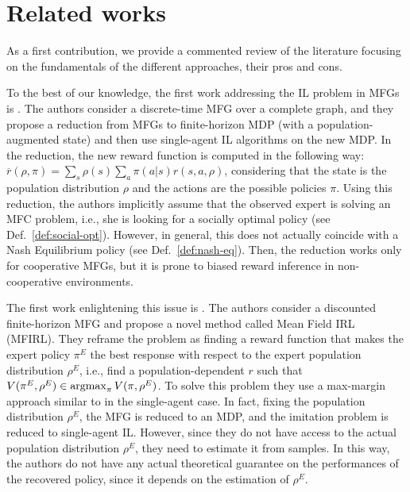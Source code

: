 \documentclass{article}
\begin{document}
\section{Related works}
\label{sec:related}
As a first contribution, we provide a commented review of the literature focusing on the fundamentals of the different approaches, their pros and cons.

% 
To the best of our knowledge, the first work addressing the IL problem in MFGs is \cite{yang2017learning}. The authors consider a discrete-time MFG over a complete graph, and they propose a reduction from MFGs to finite-horizon MDP (with a population-augmented state) and then use single-agent IL algorithms on the new MDP. In the reduction, the new reward function is computed in the following way: $\overline{r}(\rho,\pi) = \sum_{s}\rho(s)\sum_{a}\pi(a|s)r(s,a,\rho)$, considering that the state is the population distribution $\rho$ and the actions are the possible policies $\pi$. Using this reduction, the authors implicitly assume that the observed expert is solving an MFC problem, i.e., she is looking for a socially optimal policy (see Def.~\ref{def:social-opt}). However, in general, this does not actually coincide with a Nash Equilibrium policy (see Def.~\ref{def:nash-eq}). Then, the reduction works only for cooperative MFGs, but it is prone to biased reward inference in non-cooperative environments.

The first work enlightening this issue is \cite{chen2022individual}. The authors consider a discounted finite-horizon MFG and propose a novel method called Mean Field IRL (MFIRL). They reframe the problem as finding a reward function that makes the expert policy $\pi^E$ the best response with respect to the expert population distribution $\rho^E$, i.e., find a population-dependent $r$ such that $V(\pi^E, \rho^E) \in \operatorname*{argmax}_{\pi}V(\pi, \rho^E)$. 
To solve this problem they use a max-margin approach similar to \cite{ratliff2006maximum} in the single-agent case. In fact, fixing the population distribution $\rho^E$, the MFG is reduced to an MDP, and the imitation problem is reduced to single-agent IL. However, since they do not have access to the actual population distribution $\rho^E$, they need to estimate it from samples. 
In this way, the authors do not have any actual theoretical guarantee on the performances of the recovered policy, since it depends on the estimation of $\rho^E$. 
\end{document}
